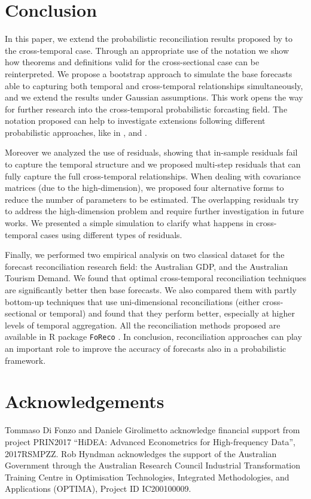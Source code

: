 \documentclass[a4paper,11pt]{article}
\theoremstyle{definition}
\begin{document}
\section{Conclusion}\label{sec:conclusion}
In this paper, we extend the probabilistic reconciliation results proposed by \cite{panagiotelis2023} to the cross-temporal case. Through an appropriate use of the notation we show how theorems and definitions valid for the cross-sectional case can be reinterpreted. We propose a bootstrap approach to simulate the base forecasts able to capturing both temporal and cross-temporal relationships simultaneously, and we extend the results under Gaussian assumptions. This work opens the way for further research into the cross-temporal probabilistic forcasting field. The notation proposed can help to investigate extensions following different probabilistic approaches, like in \cite{jeon2019}, \cite{bentaieb2021} and \cite{corani2022}.

Moreover we analyzed the use of residuals, showing that in-sample residuals fail to capture the temporal structure and we proposed multi-step residuals that can fully capture the full cross-temporal relationships. When dealing with covariance matrices (due to the high-dimension), we proposed four alternative forms to reduce the number of parameters to be estimated. The overlapping residuals try to address the high-dimension problem and require further investigation in future works. We presented a simple simulation to clarify what happens in cross-temporal cases using different types of residuals.%

Finally, we performed two empirical analysis on two classical dataset for the forecast reconciliation research field: the Australian GDP, and the Australian Tourism Demand. We found that optimal cross-temporal reconciliation techniques are significantly better then base forecasts. We also compared them with partly bottom-up techniques that use uni-dimensional reconciliations (either cross-sectional or temporal) and found that they perform better, especially at higher levels of temporal aggregation. All the reconciliation methods proposed are available in \textsf{R} package \texttt{FoReco} \citep{girolimetto2022}. In conclusion, reconciliation approaches can play an important role to improve the accuracy of forecasts also in a probabilistic framework.

\section*{Acknowledgements}
\noindent Tommaso Di Fonzo and Daniele Girolimetto acknowledge financial support from project PRIN2017 “HiDEA: Advanced Econometrics for High-frequency Data”, 2017RSMPZZ. Rob Hyndman acknowledges the support of the Australian Government through the Australian Research Council Industrial Transformation Training Centre in Optimisation Technologies, Integrated Methodologies, and Applications (OPTIMA), Project ID IC200100009.
\end{document}
